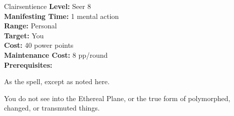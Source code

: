 {Clairsentience}
{
	\textbf{Level:}
	Seer 8\\
	\textbf{Manifesting Time:}
	1 mental action\\
	\textbf{Range:}
	Personal\\
	\textbf{Target:}
	You\\
	\textbf{Cost:}
	40 power points\\
	\textbf{Maintenance Cost:}
	8 pp/round\\
	\textbf{Prerequisites:}
	\\
}
{
	As the  spell, except as noted here.

	You do not see into the Ethereal Plane, or the true form of polymorphed, changed, or transmuted things.
}